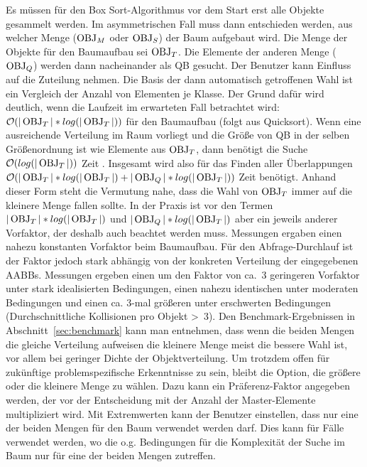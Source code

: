 Es müssen für den Box Sort-Algorithmus vor dem Start erst alle Objekte gesammelt werden. Im asymmetrischen Fall muss dann entschieden werden, aus welcher Menge ($\operatorname{OBJ}_M$ oder $\operatorname{OBJ}_S$) der Baum aufgebaut wird. Die Menge der Objekte für den Baumaufbau sei $\operatorname{OBJ}_T$. Die Elemente der anderen Menge ($\operatorname{OBJ}_Q$) werden dann nacheinander als QB gesucht. Der Benutzer kann Einfluss auf die Zuteilung nehmen. Die Basis der dann automatisch getroffenen Wahl ist ein Vergleich der Anzahl von Elementen je Klasse. Der Grund dafür wird deutlich, wenn die Laufzeit im erwarteten Fall betrachtet wird: $\mathcal{O}(|\operatorname{OBJ}_T|*log(|\operatorname{OBJ}_T|))$ für den Baumaufbau (folgt aus Quicksort). Wenn eine ausreichende Verteilung im Raum vorliegt und die Größe von QB in der selben Größenordnung ist wie Elemente aus $\operatorname{OBJ}_T$, dann benötigt die Suche $\mathcal{O}(log(|\operatorname{OBJ}_T|))$ Zeit \cite{houthuys1987box}. Insgesamt wird also für das Finden aller Überlappungen $\mathcal{O}(|\operatorname{OBJ}_T|*log(|\operatorname{OBJ}_T|)+|\operatorname{OBJ}_Q|*log(|\operatorname{OBJ}_T|))$ Zeit benötigt. Anhand dieser Form steht die Vermutung nahe, dass die Wahl von $\operatorname{OBJ}_T$ immer auf die kleinere Menge fallen sollte. In der Praxis ist vor den Termen $|\operatorname{OBJ}_T|*log(|\operatorname{OBJ}_T|)$ und $|\operatorname{OBJ}_Q|*log(|\operatorname{OBJ}_T|)$ aber ein jeweils anderer Vorfaktor, der deshalb auch beachtet werden muss. Messungen ergaben einen nahezu konstanten Vorfaktor beim Baumaufbau. Für den Abfrage-Durchlauf  ist der Faktor jedoch stark abhängig von der konkreten Verteilung der eingegebenen AABBs. Messungen ergeben einen um den Faktor von ca.~3 geringeren Vorfaktor unter stark idealisierten Bedingungen, einen nahezu identischen unter moderaten Bedingungen und einen ca. 3-mal größeren unter erschwerten Bedingungen (Durchschnittliche Kollisionen pro Objekt \textgreater ~3). Den Benchmark-Ergebnissen in Abschnitt~\ref{sec:benchmark} kann man entnehmen, dass wenn die beiden Mengen die gleiche Verteilung aufweisen die kleinere Menge meist die bessere Wahl ist, vor allem bei geringer Dichte der Objektverteilung. Um trotzdem offen für zukünftige problemspezifische Erkenntnisse zu sein, bleibt die Option, die größere oder die kleinere Menge zu wählen. Dazu kann ein Präferenz-Faktor angegeben werden, der vor der Entscheidung mit der Anzahl der Master-Elemente multipliziert wird. Mit Extremwerten kann der Benutzer einstellen, dass nur eine der beiden Mengen für den Baum verwendet werden darf. Dies kann für Fälle verwendet werden, wo die o.g. Bedingungen für die Komplexität der Suche im Baum nur für eine der beiden Mengen zutreffen.\\
 
